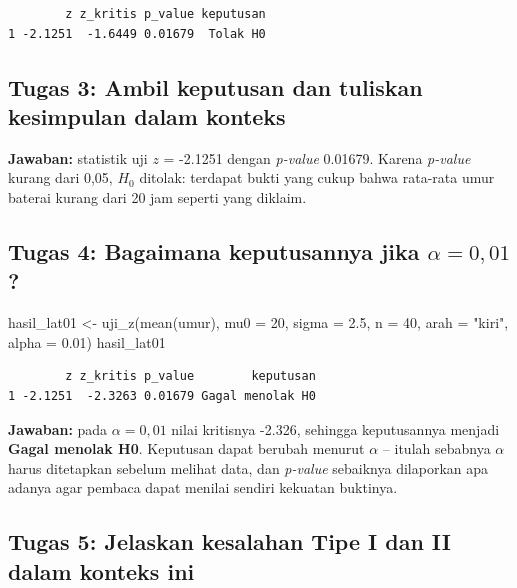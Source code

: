 \documentclass[
  indonesian,
  letterpaper,
]{book}
\newenvironment{Shaded}{\begin{snugshade}}{\end{snugshade}}
\newcommand{\AttributeTok}[1]{\textcolor[rgb]{0.40,0.45,0.13}{#1}}
\newcommand{\DecValTok}[1]{\textcolor[rgb]{0.68,0.00,0.00}{#1}}
\newcommand{\FloatTok}[1]{\textcolor[rgb]{0.68,0.00,0.00}{#1}}
\newcommand{\FunctionTok}[1]{\textcolor[rgb]{0.28,0.35,0.67}{#1}}
\newcommand{\NormalTok}[1]{\textcolor[rgb]{0.00,0.23,0.31}{#1}}
\newcommand{\OtherTok}[1]{\textcolor[rgb]{0.00,0.23,0.31}{#1}}
\newcommand{\StringTok}[1]{\textcolor[rgb]{0.13,0.47,0.30}{#1}}
\begin{document}
\begin{verbatim}
        z z_kritis p_value keputusan
1 -2.1251  -1.6449 0.01679  Tolak H0
\end{verbatim}

\subsection{Tugas 3: Ambil keputusan dan tuliskan kesimpulan dalam
konteks}\label{tugas-3-ambil-keputusan-dan-tuliskan-kesimpulan-dalam-konteks}

\textbf{Jawaban:} statistik uji \(z\) = -2.1251 dengan \emph{p-value}
0.01679. Karena \emph{p-value} kurang dari 0,05, \(H_0\) ditolak:
terdapat bukti yang cukup bahwa rata-rata umur baterai kurang dari 20
jam seperti yang diklaim.

\subsection{\texorpdfstring{Tugas 4: Bagaimana keputusannya jika
\(\alpha = 0{,}01\)?}{Tugas 4: Bagaimana keputusannya jika \textbackslash alpha = 0\{,\}01?}}\label{tugas-4-bagaimana-keputusannya-jika-alpha-001}

\begin{Shaded}
\begin{Highlighting}[]
\NormalTok{hasil\_lat01 }\OtherTok{\textless{}{-}} \FunctionTok{uji\_z}\NormalTok{(}\FunctionTok{mean}\NormalTok{(umur), }\AttributeTok{mu0 =} \DecValTok{20}\NormalTok{, }\AttributeTok{sigma =} \FloatTok{2.5}\NormalTok{, }\AttributeTok{n =} \DecValTok{40}\NormalTok{, }\AttributeTok{arah =} \StringTok{"kiri"}\NormalTok{, }\AttributeTok{alpha =} \FloatTok{0.01}\NormalTok{)}
\NormalTok{hasil\_lat01}
\end{Highlighting}
\end{Shaded}

\begin{verbatim}
        z z_kritis p_value        keputusan
1 -2.1251  -2.3263 0.01679 Gagal menolak H0
\end{verbatim}

\textbf{Jawaban:} pada \(\alpha = 0{,}01\) nilai kritisnya -2.326,
sehingga keputusannya menjadi \textbf{Gagal menolak H0}. Keputusan dapat
berubah menurut \(\alpha\) -- itulah sebabnya \(\alpha\) harus
ditetapkan sebelum melihat data, dan \emph{p-value} sebaiknya dilaporkan
apa adanya agar pembaca dapat menilai sendiri kekuatan buktinya.

\subsection{Tugas 5: Jelaskan kesalahan Tipe I dan II dalam konteks
ini}\label{tugas-5-jelaskan-kesalahan-tipe-i-dan-ii-dalam-konteks-ini}
\end{document}
